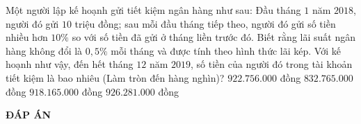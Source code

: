 \begin{ex}%
    Một người lập kế hoạnh gửi tiết kiệm ngân hàng như sau: Đầu tháng $1$ năm $2018$, người đó gửi $10$ triệu đồng; sau mỗi đầu tháng tiếp theo, người đó gửi số tiền nhiều hơn $10\%$ so với số tiền đã gửi ở tháng liền trước đó. Biết rằng lãi suất ngân hàng không đổi là $0,5\%$ mỗi tháng và được tính theo hình thức lãi kép. Với kế hoạnh như vậy, đến hết tháng $12$ năm $2019$, số tiền của người đó trong tài khoản tiết kiệm là bao nhiêu (Làm tròn đến hàng nghìn)?
    \choice
    {\True $ 922 .756. 000$ đồng}
    {$ 832 .765 .000$ đồng}
    {$ 918 .165 .000$ đồng}
    {$ 926 .281. 000$ đồng}
\end{ex}


\newpage
\begin{center}
	\textbf{ĐÁP ÁN}
\end{center}
\begin{multicols}{10}
	 
\end{multicols}

